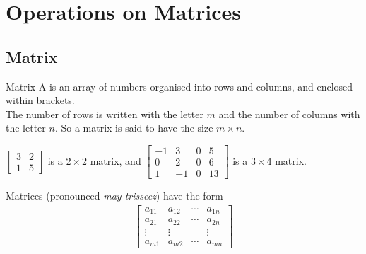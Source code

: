 \documentclass[\main/notes.tex]{subfiles}
\begin{document}
		\section{Operations on Matrices}
			\subsection{Matrix}
				\begin{definition}{Matrix}
					A  is an array of numbers organised into rows and columns, and enclosed within brackets.\\
					The number of rows is written with the letter $m$ and the number of columns with the letter $n$. So a matrix is said to have the size $m \times n$.
				\end{definition}
				\begin{example}[hbox]
					$\begin{bmatrix}
						3 & 2\\
						1 & 5
					\end{bmatrix}$ is a $2 \times 2$ matrix, and
					$\begin{bmatrix}
						-1 & 3 & 0 & 5\\
						0 & 2 & 0 & 6\\
						1 & - 1& 0 & 13
					\end{bmatrix}$ is a $3 \times 4$ matrix.
				\end{example}
				Matrices (pronounced \emph{may-trisseez}) have the form 
				\begin{align*}
					\begin{bmatrix}
						a_{11} & a_{12} & \cdots & a_{1n}\\
						a_{21} & a_{22} & \cdots & a_{2n}\\
						\vdots & \vdots & & \vdots\\
						a_{m1} & a_{m2} & \cdots & a_{mn}
					\end{bmatrix}
				\end{align*}
\end{document}
